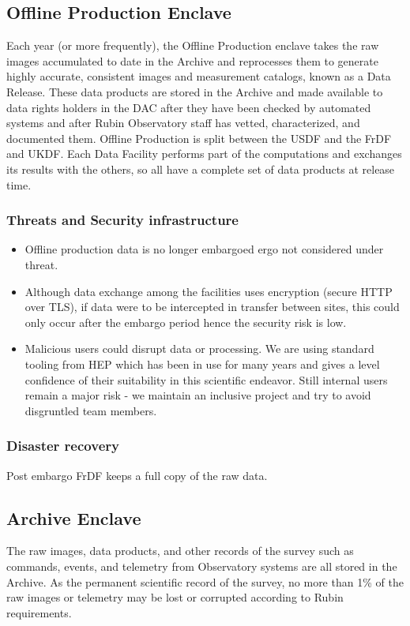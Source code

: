 \subsection{ Offline Production  \gls{Enclave}}
Each year (or more frequently), the Offline Production enclave takes the raw images accumulated to date in the Archive and reprocesses them to generate highly accurate, consistent images and measurement catalogs, known as a Data Release. These data products are stored in the Archive and made available to data rights holders in the DAC after they have been checked by automated systems and after Rubin Observatory staff has vetted, characterized, and documented them. Offline Production is split between the USDF and the \gls{FrDF} and UKDF. Each Data Facility performs part of the computations and exchanges its results with the others, so all have a complete set of data products at release time.


\subsubsection{ Threats and Security infrastructure}
\begin{itemize}
\item Offline production data is no longer embargoed ergo not considered under threat.
\item Although data exchange among the facilities uses encryption (secure HTTP over TLS), if data were to be intercepted in transfer between sites, this could only occur after the embargo period hence the security risk is low.
\item Malicious users could disrupt data or processing.
We are using standard tooling from \gls{HEP} which has been in use for many years and gives a level confidence of their suitability in this scientific endeavor.
Still internal users remain a major risk - we maintain an inclusive project and try to avoid disgruntled team members.
\end{itemize}
\subsubsection{Disaster recovery}
Post embargo FrDF keeps a full copy of the raw data.

\subsection{ \gls{Archive}  Enclave}
The raw images, data products, and other records of the survey such as commands, events, and telemetry from Observatory systems are all stored in the \gls{Archive}.
As the permanent scientific record of the survey, no more than 1\% of the raw images or telemetry may be lost or corrupted according to Rubin requirements.

